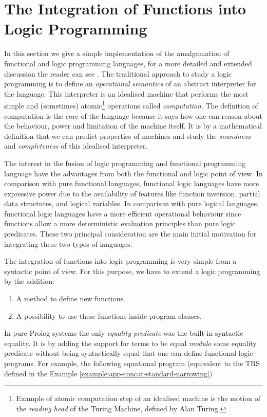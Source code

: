 \section{The Integration of Functions into Logic Programming}
In this section we give a simple implementation of the amalgamation of functional and logic programming languages, for a more detailed and extended discussion the reader can see \cite{HANUS1994583}. The traditional approach to study a logic programming  is to define an \textit{operational semantics} of an abstract interpreter for the language. This interpreter is an idealised machine that performs the most simple and (sometimes) atomic\footnote{Example of atomic computation step of an idealised machine is the motion of the \textit{reading head} of the Turing Machine, defined by Alan Turing.} operations called \textit{computation}. The definition of computation is the core of the language because it says how one can reason about the behaviour, power and limitation of the machine itself. It is by a mathematical definition that we can predict properties of machines and study the \textit{soundness} and \textit{completeness} of this idealised interpreter.

The interest in the fusion of logic programming and functional programming language have the advantages from both the functional and logic point of view. In comparison with pure functional languages, functional logic languages have more expressive power due to the availability of features like function inversion, partial data structures, and logical variables. In comparison with pure logical languages, functional logic languages have a more efficient operational behaviour since functions allow a more deterministic evaluation principles than pure logic predicates. These two principal consideration are the main initial motivation for integrating these two types of languages.

The integration of functions into logic programming is very simple from a syntactic point of view. For this purpose, we have to extend a logic programming by the addition:
\begin{enumerate}
	\item A method to define new functions.
	\item A possibility to use these functions inside program clauses.
\end{enumerate}

In pure Prolog systems the only \textit{equality predicate} was the built-in syntactic equality. It is by adding the support for terms to be equal \textit{modulo} some equality predicate without being syntactically equal that one can define functional logic programs. For example, the following equational program (equivalent to the TRS defined in the Example \ref{example:app-concat-standard-narrowing})

